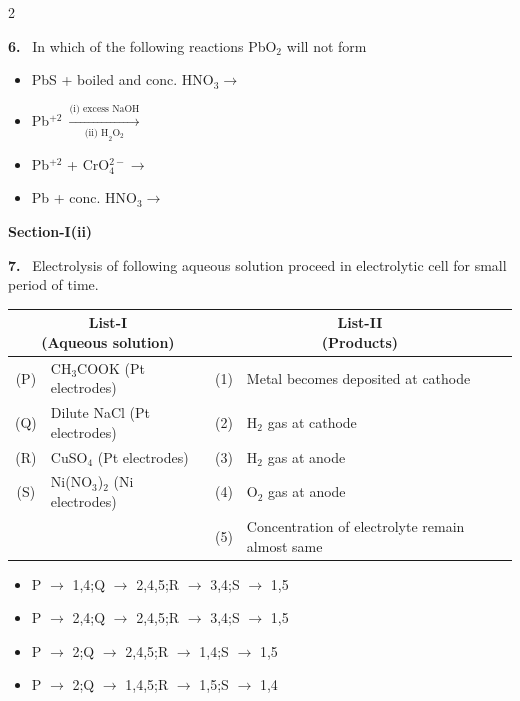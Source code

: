 \documentclass[10pt]{extarticle}
\newcommand{\sect}[1]{\par\smallskip\noindent\textbf{#1}\par}
\newcommand{\qn}[1]{\par\smallskip\noindent\textbf{#1.}~}
\newenvironment{qoptions}{\begin{itemize}[leftmargin=1.8em,itemsep=1pt,topsep=2pt,label={}]}{\end{itemize}}
\newcommand{\opt}[2]{\item[(#1)] #2}
\begin{document}
\begin{multicols}{2}
\qn{6} In which of the following reactions PbO$_2$ will not form
\begin{qoptions}
\opt{A}{PbS + boiled and conc. HNO$_3\to$}
\opt{B}{Pb$^{+2}\ \xrightarrow[\text{(ii) H}_2\text{O}_2]{\text{(i) excess NaOH}}$}
\opt{C}{Pb$^{+2}$ + CrO$_4^{2-}\to$}
\opt{D}{Pb + conc. HNO$_3\to$}
\end{qoptions}

\sect{Section-I(ii)}

\qn{7} Electrolysis of following aqueous solution proceed in electrolytic cell for small period of time.
\begin{center}\small\setlength{\tabcolsep}{3pt}
\begin{tabular}{|c|p{2.5cm}|c|p{2.5cm}|}
\hline
\multicolumn{2}{|c|}{\parbox{3.3cm}{\centering List-I\\(Aqueous solution)}} & \multicolumn{2}{c|}{\parbox{3.3cm}{\centering List-II\\(Products)}} \\
\hline
(P) & CH$_3$COOK (Pt electrodes) & (1) & Metal becomes deposited at cathode \\
\hline
(Q) & Dilute NaCl (Pt electrodes) & (2) & H$_2$ gas at cathode \\
\hline
(R) & CuSO$_4$ (Pt electrodes) & (3) & H$_2$ gas at anode \\
\hline
(S) & Ni(NO$_3$)$_2$ (Ni electrodes) & (4) & O$_2$ gas at anode \\
\hline
 & & (5) & Concentration of electrolyte remain almost same \\
\hline
\end{tabular}
\end{center}
\begin{qoptions}
\opt{A}{P $\to$ 1,4;Q $\to$ 2,4,5;R $\to$ 3,4;S $\to$ 1,5}
\opt{B}{P $\to$ 2,4;Q $\to$ 2,4,5;R $\to$ 3,4;S $\to$ 1,5}
\opt{C}{P $\to$ 2;Q $\to$ 2,4,5;R $\to$ 1,4;S $\to$ 1,5}
\opt{D}{P $\to$ 2;Q $\to$ 1,4,5;R $\to$ 1,5;S $\to$ 1,4}
\end{qoptions}


\end{multicols}
\end{document}
